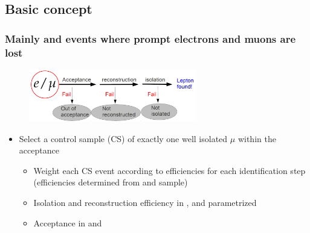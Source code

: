 \documentclass{beamer}
\begin{document}
\subsection{Basic concept}
\begin{frame}
  \frametitle{Mainly \ttbar and \wpj events where prompt electrons and muons are lost}
   \begin{figure}
 \centering
  \includegraphics[width = 0.65\textwidth]{figures/lepton_veto_sketch.png}
 \end{figure}
      \begin{itemize}
      \item Select a control sample (CS) of exactly one well isolated $\mu$ within the acceptance
        \begin{itemize}
        \item Weight each CS event according to efficiencies for each identification step \\ (efficiencies determined from \ttbar and \wpj sample)
        \item Isolation and reconstruction efficiency in \HT, \MHT and \NJets parametrized
        \item Acceptance in \MHT and \NJets
        \end{itemize}
      \end{itemize}
\end{frame}
\end{document}
